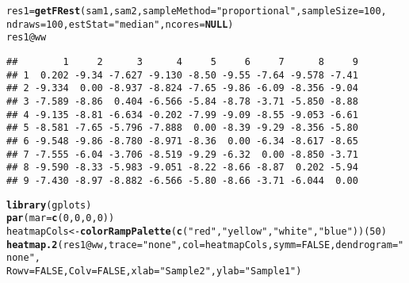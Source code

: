 \documentclass[12pt]{article}\usepackage[]{graphicx}\usepackage[usenames,dvipsnames]{color}
\makeatletter
\newcommand{\hlnum}[1]{\textcolor[rgb]{0.686,0.059,0.569}{#1}}%
\newcommand{\hlstr}[1]{\textcolor[rgb]{0.192,0.494,0.8}{#1}}%
\newcommand{\hlopt}[1]{\textcolor[rgb]{0,0,0}{#1}}%
\newcommand{\hlstd}[1]{\textcolor[rgb]{0.345,0.345,0.345}{#1}}%
\newcommand{\hlkwa}[1]{\textcolor[rgb]{0.161,0.373,0.58}{\textbf{#1}}}%
\newcommand{\hlkwb}[1]{\textcolor[rgb]{0.69,0.353,0.396}{#1}}%
\newcommand{\hlkwc}[1]{\textcolor[rgb]{0.333,0.667,0.333}{#1}}%
\newcommand{\hlkwd}[1]{\textcolor[rgb]{0.737,0.353,0.396}{\textbf{#1}}}%
\newenvironment{kframe}{%
 \def\at@end@of@kframe{}%
 \ifinner\ifhmode%
  \def\at@end@of@kframe{\end{minipage}}%
  \begin{minipage}{\columnwidth}%
 \fi\fi%
 \def\FrameCommand##1{\hskip\@totalleftmargin \hskip-\fboxsep
 \colorbox{shadecolor}{##1}\hskip-\fboxsep
     \hskip-\linewidth \hskip-\@totalleftmargin \hskip\columnwidth}%
 \MakeFramed {\advance\hsize-\width
   \@totalleftmargin\z@ \linewidth\hsize
   \@setminipage}}%
 {\par\unskip\endMakeFramed%
 \at@end@of@kframe}
\newenvironment{knitrout}{}{} %
\makeatother
\begin{document}
\begin{knitrout}
\color{fgcolor}\begin{kframe}
\begin{alltt}
\hlstd{res1} \hlkwb{=} \hlkwd{getFRest}\hlstd{(sam1,sam2,}\hlkwc{sampleMethod}\hlstd{=}\hlstr{"proportional"}\hlstd{,}\hlkwc{sampleSize}\hlstd{=}\hlnum{100}\hlstd{,}
                \hlkwc{ndraws}\hlstd{=}\hlnum{100}\hlstd{,}\hlkwc{estStat}\hlstd{=}\hlstr{"median"}\hlstd{,}\hlkwc{ncores}\hlstd{=}\hlkwa{NULL}\hlstd{)}
\hlstd{res1}\hlopt{@}\hlkwc{ww}
\end{alltt}
\begin{verbatim}
##        1     2      3      4     5     6     7      8     9
## 1  0.202 -9.34 -7.627 -9.130 -8.50 -9.55 -7.64 -9.578 -7.41
## 2 -9.334  0.00 -8.937 -8.824 -7.65 -9.86 -6.09 -8.356 -9.04
## 3 -7.589 -8.86  0.404 -6.566 -5.84 -8.78 -3.71 -5.850 -8.88
## 4 -9.135 -8.81 -6.634 -0.202 -7.99 -9.09 -8.55 -9.053 -6.61
## 5 -8.581 -7.65 -5.796 -7.888  0.00 -8.39 -9.29 -8.356 -5.80
## 6 -9.548 -9.86 -8.780 -8.971 -8.36  0.00 -6.34 -8.617 -8.65
## 7 -7.555 -6.04 -3.706 -8.519 -9.29 -6.32  0.00 -8.850 -3.71
## 8 -9.590 -8.33 -5.983 -9.051 -8.22 -8.66 -8.87  0.202 -5.94
## 9 -7.430 -8.97 -8.882 -6.566 -5.80 -8.66 -3.71 -6.044  0.00
\end{verbatim}
\begin{alltt}
\hlkwd{library}\hlstd{(gplots)}
\hlkwd{par}\hlstd{(}\hlkwc{mar}\hlstd{=}\hlkwd{c}\hlstd{(}\hlnum{0}\hlstd{,}\hlnum{0}\hlstd{,}\hlnum{0}\hlstd{,}\hlnum{0}\hlstd{))}
\hlstd{heatmapCols} \hlkwb{<-} \hlkwd{colorRampPalette}\hlstd{(}\hlkwd{c}\hlstd{(}\hlstr{"red"}\hlstd{,}\hlstr{"yellow"}\hlstd{,}\hlstr{"white"}\hlstd{,}\hlstr{"blue"}\hlstd{))(}\hlnum{50}\hlstd{)}
\hlkwd{heatmap.2}\hlstd{(res1}\hlopt{@}\hlkwc{ww}\hlstd{,}\hlkwc{trace}\hlstd{=}\hlstr{"none"}\hlstd{,}\hlkwc{col}\hlstd{=heatmapCols,}\hlkwc{symm}\hlstd{=}\hlnum{FALSE}\hlstd{,}\hlkwc{dendrogram}\hlstd{=}\hlstr{"none"}\hlstd{,}
          \hlkwc{Rowv}\hlstd{=}\hlnum{FALSE}\hlstd{,}\hlkwc{Colv}\hlstd{=}\hlnum{FALSE}\hlstd{,}\hlkwc{xlab}\hlstd{=}\hlstr{"Sample 2"}\hlstd{,}\hlkwc{ylab}\hlstd{=}\hlstr{"Sample 1"}\hlstd{)}
\end{alltt}
\end{kframe}
\end{knitrout}

\end{document}
